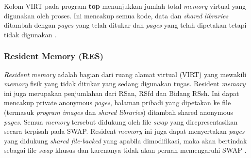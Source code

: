 Kolom VIRT pada program \textbf{top} menunjukkan jumlah total \textit{memory} virtual yang digunakan oleh proses. Ini mencakup semua kode, data dan \textit{shared  libraries} ditambah dengan \textit{pages} yang telah ditukar dan \textit{pages} yang telah dipetakan tetapi tidak digunakan \cite{manual:linux}. 



\subsubsection{Resident Memory (RES)}

\textit{Resident} \textit{memory} adalah bagian dari ruang alamat virtual (VIRT) yang mewakili \textit{memory} fisik yang tidak ditukar yang sedang digunakan tugas. Resident \textit{memory} ini juga merupakan penjumlahan dari RSan, RSfd dan Bidang RSsh. Ini dapat mencakup private anonymous \textit{pages}, halaman pribadi yang dipetakan ke file (termasuk
\textit{program images} dan \textit{shared libraries}) ditambah shared anonymous \textit{pages}. Semua \textit{memory} tersebut didukung oleh file \textit{swap} yang direpresentasikan secara terpisah pada SWAP. Resident \textit{memory} ini juga dapat menyertakan \textit{pages} yang didukung \textit{shared file-backed} yang apabila dimodifikasi, maka akan bertindak sebagai file \textit{swap} khusus dan karenanya tidak akan pernah memengaruhi SWAP \cite{manual:linux}.




